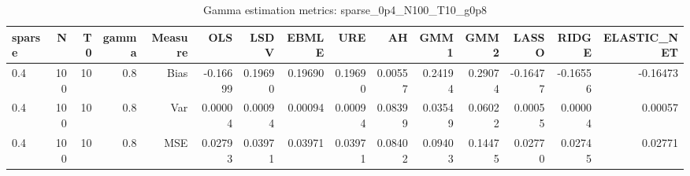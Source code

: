 \begin{table}[!htbp]\centering
\caption{Gamma estimation metrics: sparse_0p4_N100_T10_g0p8}
\label{tab:table1_sparse_0p4_N100_T10_g0p8}
\begin{tabular}{lrrrrrrrrrrrrrr}
\hline
sparse & N & T0 & gamma & Measure & OLS & LSDV & EBMLE & URE & AH & GMM1 & GMM2 & LASSO & RIDGE & ELASTIC_NET \\
\hline
0.4 & 100 & 10 & 0.8 & Bias & -0.16699 & 0.19690 & 0.19690 & 0.19690 & 0.00557 & 0.24194 & 0.29074 & -0.16477 & -0.16556 & -0.16473 \\
0.4 & 100 & 10 & 0.8 & Var & 0.00004 & 0.00094 & 0.00094 & 0.00094 & 0.08399 & 0.03549 & 0.06022 & 0.00055 & 0.00004 & 0.00057 \\
0.4 & 100 & 10 & 0.8 & MSE & 0.02793 & 0.03971 & 0.03971 & 0.03971 & 0.08402 & 0.09403 & 0.14475 & 0.02770 & 0.02745 & 0.02771 \\
\hline
\end{tabular}
\end{table}

